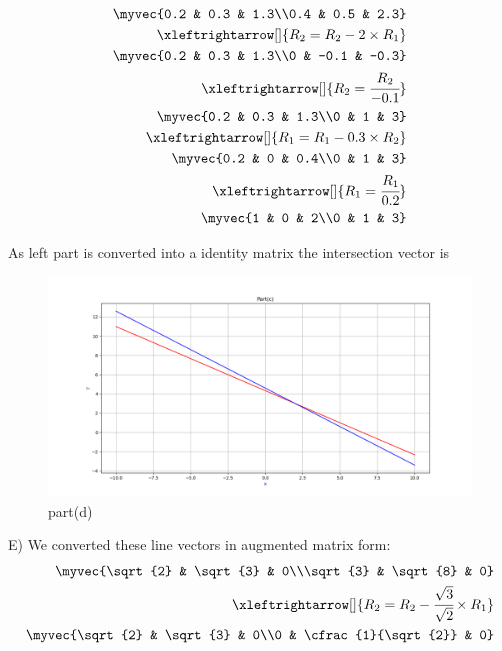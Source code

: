 \begin{enumerate}[label=\thesection.\arabic*.,ref=\thesection.\theenumi]
\begin{align*}
    \myvec{0.2 & 0.3 & 1.3\\0.4 & 0.5 & 2.3}
\\
    \xleftrightarrow[]{R_{2}=R_{2}-2\times R_{1}}
\\
    \myvec{0.2 & 0.3 & 1.3\\0 & -0.1 & -0.3}
\\
    \xleftrightarrow[]{R_{2}=\cfrac{R_{2}}{-0.1}}
\\
    \myvec{0.2 & 0.3 & 1.3\\0 & 1 & 3}
\\
    \xleftrightarrow[]{R_{1}=R_{1}-0.3 \times R_{2}}
\\
    \myvec{0.2 & 0 & 0.4\\0 & 1 & 3}
\\
    \xleftrightarrow[]{R_{1}=\cfrac{R_{1}}{0.2}}
\\
    \myvec{1 & 0 & 2\\0 & 1 & 3}
\end{align*}

As left part is converted into a identity matrix the intersection vector is \\

\renewcommand{\thefigure}{\theenumi.\arabic{figure}}
\begin{figure}[!ht]
    \centering
    \includegraphics[width=\columnwidth]{./figures/A1_partd}
\caption{part(d)}
\label{fig: part(d)}
\end{figure}

E)
We converted these line vectors in augmented matrix form:\\ 

\begin{align*}
    \myvec{\sqrt{2} & \sqrt{3} & 0\\\sqrt{3} & \sqrt{8} & 0}
\\
    \xleftrightarrow[]{R_{2}=R_{2}-\cfrac{\sqrt{3}}{\sqrt{2}}\times R_{1}}
\\
    \myvec{\sqrt{2} & \sqrt{3} & 0\\0 & \cfrac{1}{\sqrt{2}} & 0}
\end{align*}


\end{enumerate}
